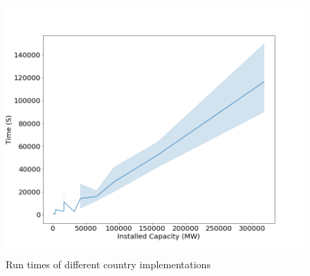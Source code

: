 \begin{figure}
	\centering
	\includegraphics[width=1\linewidth]{figures/timing_plot}
	\caption{Run times of different country implementations}
	\label{fig:timingplot}
\end{figure}



